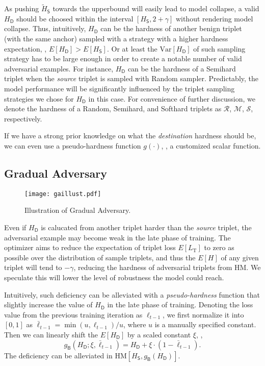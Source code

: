\documentclass[10pt,twocolumn,letterpaper]{article}
\begin{document}
As pushing $\tilde{H}_\mathsf{S}$ towards the upperbound will easily lead to
model collapse, a valid $H_\mathsf{D}$ should be choosed within the interval
$[H_\mathsf{S},2+\gamma]$ without rendering model collapse.
%
Thus, intuitively, $H_\mathsf{D}$ can be the hardness of another benign triplet
(with the same anchor) sampled with a strategy with a higher hardness
expectation, \ie, $E[H_\mathsf{D}] > E[H_\mathsf{S}]$.
%
Or at least the $\text{Var}[H_\mathsf{D}]$ of such sampling strategy has to be
large enough in order to create a notable number of valid adversarial examples.
%
For instance, $H_\mathsf{D}$ can be the hardness of a Semihard~\cite{facenet}
triplet when the \emph{source} triplet is sampled with Random sampler.
%
Predictably, the model performance will be significantly influenced by the
triplet sampling strategies we chose for $H_\mathsf{D}$ in this case.
%
For convenience of further discussion, we denote the hardness of a Random,
Semihard, and Softhard triplets as $\mathcal{R}$,
$\mathcal{M}$, $\mathcal{S}$, respectively.

If we have a strong prior knowledge on what the \emph{destination} hardness
should be, we can even use a pseudo-hardness function $g(\cdot)$, \ie, a
customized scalar function.



\subsection{Gradual Adversary}
\label{sec:32}

\begin{figure}
	\texttt{[image: gaillust.pdf]}
	\caption{Illustration of Gradual Adversary.}
	\label{fig:ga}
\end{figure}



Even if $H_\mathsf{D}$ is calucated from another triplet harder than the
\emph{source} triplet, the adversarial example may become weak in the late
phase of training.
%
The optimizer aims to reduce the expectation of triplet
loss $E[L_\text{T}]$ to zero as possible over the distribution of sample triplets, and thus
the $E[H]$ of any given triplet will tend to $-\gamma$, reducing the
hardness of adversarial triplets from HM.
%
We speculate this will lower the level of robustness the model could reach.


Intuitively, such deficiency can be alleviated with a \emph{pseudo-hardness}
function that slightly increase the value of $H_\mathsf{D}$ in the late phase
of training.
%
Denoting the loss value from the previous training iteration as $\ell_{t-1}$,
we first normalize it into $[0,1]$ as $\bar{\ell}_{t-1}=\min(u,\ell_{t-1})/u$,
where $u$ is a manually specified constant.
%
Then we can linearly shift the $E[H_\mathsf{D}]$ by a scaled constant $\xi$,
\ie,
%
\begin{equation}
	g_\mathsf{B}(H_\mathsf{D};\xi,\bar{\ell}_{t-1}) =
	H_\mathsf{D} + \xi \cdot (1-\bar{\ell}_{t-1}).
\end{equation}
%
The deficiency can be alleviated in
$\text{HM}[H_\mathsf{S},g_\mathsf{B}(H_\mathsf{D})]$.
\end{document}
